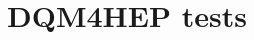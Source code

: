 \documentclass[8pt]{beamer}
\begin{document}
\begin{frame}
\begin{overlayarea}{\textwidth}{\textheight}
\begin{center}
      \end{center}
    \end{overlayarea}
    
  \end{frame}
    
    
    
  
  \section{DQM4HEP tests}
\end{document}
